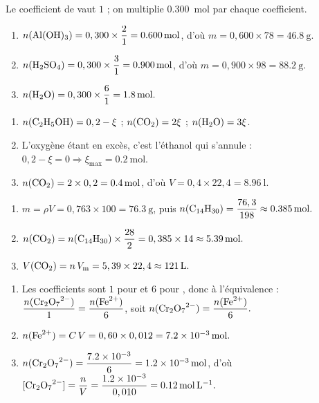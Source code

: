 \documentclass[11pt,a4paper]{article}
\begin{document}
\begin{corrige}
Le coefficient de  vaut $1$ ; on multiplie \qty{0.300}{\mole} par chaque coefficient.
\begin{enumerate}[label=\alph*)]
  \item $n(\ce{Al(OH)3})=0,300\times\dfrac{2}{1}=\qty{0.600}{\mole}$, d'où
        $m=0,600\times78=\qty{46.8}{\gram}.$
  \item $n(\ce{H2SO4})=0,300\times\dfrac{3}{1}=\qty{0.900}{\mole}$, d'où
        $m=0,900\times98=\qty{88.2}{\gram}.$
  \item $n(\ce{H2O})=0,300\times\dfrac{6}{1}=\qty{1.8}{\mole}.$
\end{enumerate}
\end{corrige}

\begin{corrige}
\begin{enumerate}[label=\alph*)]
  \item $n(\ce{C2H5OH})=0,2-\xi$ ; \; $n(\ce{CO2})=2\xi$ ; \; $n(\ce{H2O})=3\xi$.
  \item L'oxygène étant en excès, c'est l'éthanol qui s'annule :
        $0,2-\xi=0\Rightarrow \xi_{\max}=\qty{0.2}{\mole}.$
  \item $n(\ce{CO2})=2\times0,2=\qty{0.4}{\mole}$, d'où $V=0,4\times22,4=\qty{8.96}{\litre}.$
\end{enumerate}
\end{corrige}

\begin{corrige}
\begin{enumerate}[label=\alph*)]
  \item $m=\rho V=0,763\times100=\qty{76.3}{\gram}$, puis
        $n(\ce{C14H30})=\dfrac{76,3}{198}\approx\qty{0.385}{\mole}.$
  \item $n(\ce{CO2})=n(\ce{C14H30})\times\dfrac{28}{2}=0,385\times14\approx\qty{5.39}{\mole}.$
  \item $V(\ce{CO2})=n\,V_{\mathrm{m}}=5,39\times22,4\approx\qty{121}{\litre}.$
\end{enumerate}
\end{corrige}

\begin{corrige}
\begin{enumerate}[label=\alph*)]
  \item Les coefficients sont $1$ pour  et $6$ pour , donc à l'équivalence :
        $\dfrac{n(\ce{Cr2O7^2-})}{1}=\dfrac{n(\ce{Fe^2+})}{6}$, soit
        $n(\ce{Cr2O7^2-})=\dfrac{n(\ce{Fe^2+})}{6}.$
  \item $n(\ce{Fe^2+})=C\,V=0,60\times0,012=\qty{7.2e-3}{\mole}.$
  \item $n(\ce{Cr2O7^2-})=\dfrac{\num{7.2e-3}}{6}=\qty{1.2e-3}{\mole}$, d'où
        $[\ce{Cr2O7^2-}]=\dfrac{n}{V}=\dfrac{\num{1.2e-3}}{0,010}=\qty{0.12}{\mole\per\litre}.$
\end{enumerate}
\end{corrige}
\end{document}
